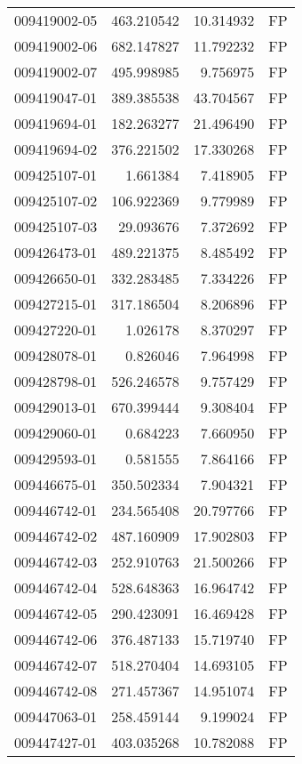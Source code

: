\begin{tabular}{lrrl}
009419002-05 &  463.210542 &    10.314932 &   FP \\
009419002-06 &  682.147827 &    11.792232 &   FP \\
009419002-07 &  495.998985 &     9.756975 &   FP \\
009419047-01 &  389.385538 &    43.704567 &   FP \\
009419694-01 &  182.263277 &    21.496490 &   FP \\
009419694-02 &  376.221502 &    17.330268 &   FP \\
009425107-01 &    1.661384 &     7.418905 &   FP \\
009425107-02 &  106.922369 &     9.779989 &   FP \\
009425107-03 &   29.093676 &     7.372692 &   FP \\
009426473-01 &  489.221375 &     8.485492 &   FP \\
009426650-01 &  332.283485 &     7.334226 &   FP \\
009427215-01 &  317.186504 &     8.206896 &   FP \\
009427220-01 &    1.026178 &     8.370297 &   FP \\
009428078-01 &    0.826046 &     7.964998 &   FP \\
009428798-01 &  526.246578 &     9.757429 &   FP \\
009429013-01 &  670.399444 &     9.308404 &   FP \\
009429060-01 &    0.684223 &     7.660950 &   FP \\
009429593-01 &    0.581555 &     7.864166 &   FP \\
009446675-01 &  350.502334 &     7.904321 &   FP \\
009446742-01 &  234.565408 &    20.797766 &   FP \\
009446742-02 &  487.160909 &    17.902803 &   FP \\
009446742-03 &  252.910763 &    21.500266 &   FP \\
009446742-04 &  528.648363 &    16.964742 &   FP \\
009446742-05 &  290.423091 &    16.469428 &   FP \\
009446742-06 &  376.487133 &    15.719740 &   FP \\
009446742-07 &  518.270404 &    14.693105 &   FP \\
009446742-08 &  271.457367 &    14.951074 &   FP \\
009447063-01 &  258.459144 &     9.199024 &   FP \\
009447427-01 &  403.035268 &    10.782088 &   FP \\

\end{tabular}

